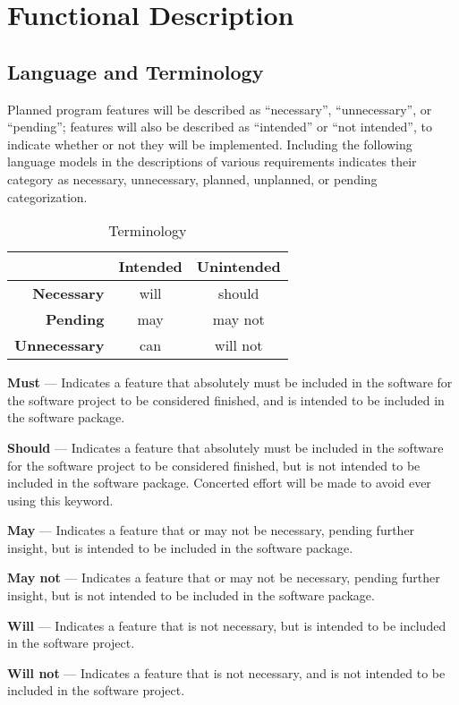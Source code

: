 \documentclass[12pt]{article}
\begin{document}
\section{Functional Description}
\subsection{Language and Terminology}
Planned program features will be described as ``necessary'', ``unnecessary'',
or ``pending''; features will also be described as ``intended'' or ``not
intended'', to indicate whether or not they will be implemented.
Including the following language models in the descriptions of various
requirements indicates their category as necessary, unnecessary, planned,
unplanned, or pending categorization.

\begin{table}[!h]
\centering
\begin{tabular}{r|cc} 
& \textbf{Intended} & \textbf{Unintended} \\ 
\hline 
\textbf{Necessary} & will & should \\ 
\textbf{Pending} & may & may not \\ 
\textbf{Unnecessary} & can & will not \\ 
\end{tabular}
\caption{Terminology}
\end{table}

\textbf{Must} --- Indicates a feature that absolutely must be included in the
software for the software project to be considered finished, and is intended
to be included in the software package.
	
\textbf{Should} --- Indicates a feature that absolutely must be included in the
software for the software project to be considered finished, but is not
intended to be included in the software package.  Concerted effort will be made
to avoid ever using this keyword.
	
\textbf{May} --- Indicates a feature that or may not be necessary, pending
further insight, but is intended to be included in the software package.
	
\textbf{May not} --- Indicates a feature that or may not be necessary, pending
further insight, but is not intended to be included in the software package.
	
\textbf{Will} --- Indicates a feature that is not necessary, but is intended
to be included in the software project.
	
\textbf{Will not} --- Indicates a feature that is not necessary, and is not
intended to be included in the software project.
\end{document}
